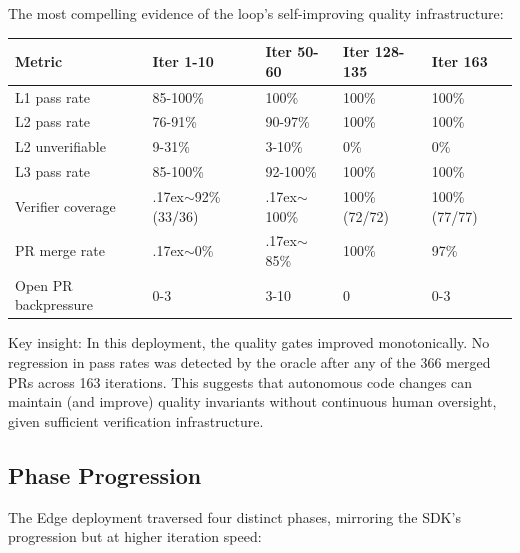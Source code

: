 \documentclass[11pt,a4paper]{article}
\newcounter{none} %
\newcommand{\roughly}{{\textraisebox{.17ex}{$\scriptstyle\sim$}}}
\newcommand{\textraisebox}[2]{\leavevmode\raise#1\hbox{#2}}
\begin{document}
The most compelling evidence of the loop's self-improving quality infrastructure:

{\def\LTcaptype{none} %
\begin{longtable}[]{@{}lllll@{}}
\toprule\noalign{}
Metric & Iter 1-10 & Iter 50-60 & Iter 128-135 & Iter 163 \\
\midrule\noalign{}
\endhead
\bottomrule\noalign{}
\endlastfoot
L1 pass rate & 85-100\% & 100\% & 100\% & 100\% \\
L2 pass rate & 76-91\% & 90-97\% & 100\% & 100\% \\
L2 unverifiable & 9-31\% & 3-10\% & 0\% & 0\% \\
L3 pass rate & 85-100\% & 92-100\% & 100\% & 100\% \\
Verifier coverage & \roughly92\% (33/36) & \roughly100\% & 100\% (72/72) & 100\% (77/77) \\
PR merge rate & \roughly0\% & \roughly85\% & 100\% & 97\% \\
Open PR backpressure & 0-3 & 3-10 & 0 & 0-3 \\
\end{longtable}
}

Key insight: In this deployment, the quality gates improved monotonically. No regression in pass rates was detected by the oracle after any of the 366 merged PRs across 163 iterations. This suggests that autonomous code changes can maintain (and improve) quality invariants without continuous human oversight, given sufficient verification infrastructure.

\subsection{Phase Progression}\label{sec:edge-phase-progression}

The Edge deployment traversed four distinct phases, mirroring the SDK's progression but at higher iteration speed:
\end{document}
